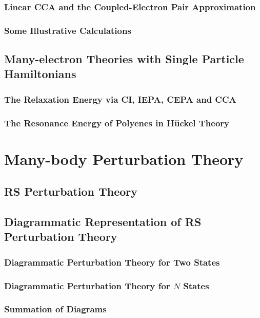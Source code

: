 \documentclass[a4paper]{article}
\numberwithin{equation}{section}
\begin{document}
\subsubsection{Linear CCA and the Coupled-Electron Pair Approximation}

\subsubsection{Some Illustrative Calculations}

\subsection{Many-electron Theories with Single Particle Hamiltonians}
\subsubsection{The Relaxation Energy via CI, IEPA, CEPA and CCA}

\subsubsection{The Resonance Energy of Polyenes in H\"uckel Theory}




\section{Many-body Perturbation Theory}
\subsection{RS Perturbation Theory}

\subsection{Diagrammatic Representation of RS Perturbation Theory}
\subsubsection{Diagrammatic Perturbation Theory for Two States}
\subsubsection{Diagrammatic Perturbation Theory for $ N $ States}
\subsubsection{Summation of Diagrams}
\end{document}
